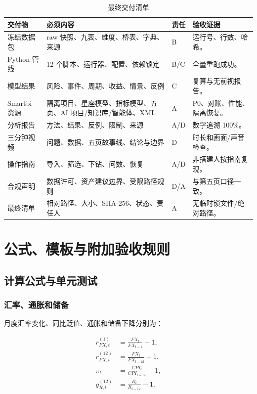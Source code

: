 \documentclass[UTF8,fontset=windows,12pt,openany]{ctexbook}
\begin{document}
\begin{longtable}{p{4.2cm}p{4.3cm}p{2.5cm}p{3.2cm}}
\caption{最终交付清单}\label{tab:handoff}\\
\toprule
\textbf{交付物} & \textbf{必须内容} & \textbf{责任} & \textbf{验收证据}\\
\midrule
冻结数据包 & raw 快照、九表、维度、桥表、字典、来源 & B & 运行号、行数、哈希。\\
Python 管线 & 12 个脚本、运行器、配置、依赖锁定 & B/C & 全量重跑成功。\\
模型结果 & 风险、事件、周期、收益、情景、反例 & C & 复算与无前视报告。\\
Smartbi 资源 & 隔离项目、星座模型、指标模型、五页、AI 项目/知识库/智能体、XML & A & P0、对账、性能、隔离恢复。\\
分析报告 & 方法、结果、反例、限制、来源 & A/D & 数字追溯 100\%。\\
三分钟视频 & 问题、数据、五页故事线、结论与边界 & D & 时长和画面/声音检查。\\
操作指南 & 导入、筛选、下钻、问数、恢复 & A/D & 非搭建人按指南复现。\\
合规声明 & 数据许可、资产建议边界、受限路径规则 & D/A & 与第五页口径一致。\\
最终清单 & 相对路径、大小、SHA-256、状态、责任人 & A & 无临时锁文件/绝对路径。\\
\bottomrule
\end{longtable}

\part{公式、模板与附加验收规则}

\chapter{计算公式与单元测试}

\section{汇率、通胀和储备}

月度汇率变化、同比贬值、通胀和储备下降分别为：

\begin{align}
r_{FX,t}^{(1)} &= \frac{FX_t}{FX_{t-1}}-1,\\
r_{FX,t}^{(12)} &= \frac{FX_t}{FX_{t-12}}-1,\\
\pi_t &= \frac{CPI_t}{CPI_{t-12}}-1,\\
g_{R,t}^{(12)} &= \frac{R_t}{R_{t-12}}-1.
\end{align}
\end{document}
